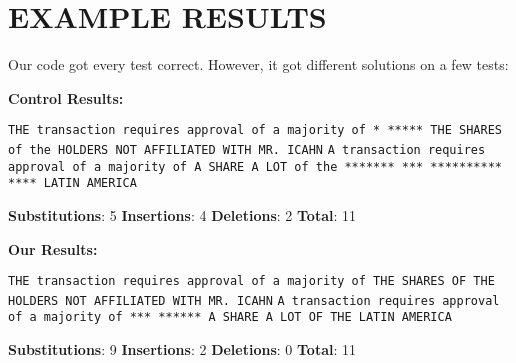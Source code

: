 \documentclass{article}
\begin{document}
\section{\MakeUppercase{Example Results}}
\begin{flushleft}
Our code got every test correct. However, it got different solutions on a few tests:
\break\break

\textbf{Control Results:}\break
\begin{scriptsize}
\texttt{THE transaction requires approval of a majority of * ***** THE SHARES of the HOLDERS NOT AFFILIATED WITH MR.\hspace{7pt}   ICAHN}\break  
\texttt{A\hspace{7.5pt} transaction requires approval of a majority of A SHARE A\hspace{7.5pt}   LOT\hspace{11pt}    of the ******* *** ********** **** LATIN AMERICA}\break
\end{scriptsize}
\small{\textbf{Substitutions}: 5 \textbf{Insertions}: 4 \textbf{Deletions}: 2 \textbf{Total}: 11}\break\break

\textbf{Our Results:}\break
\begin{scriptsize}
\texttt{THE transaction requires approval of a majority of THE SHARES OF THE\hspace{7.5pt} HOLDERS NOT AFFILIATED WITH MR. \hspace{7pt}ICAHN}\break		
\texttt{A\hspace{7.25pt} transaction requires approval of a majority of *** ****** \hspace{.5pt}A\hspace{3.5pt} SHARE A\hspace{22pt} LOT OF\hspace{29.5pt} THE\hspace{4pt} LATIN AMERICA}\break
\end{scriptsize}
\small{\textbf{Substitutions}: 9 \textbf{Insertions}: 2 \textbf{Deletions}: 0 \textbf{Total}: 11\break}



\end{flushleft}
\end{document}
